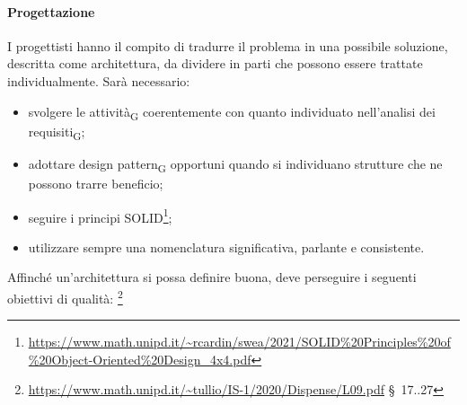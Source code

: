         \paragraph{Progettazione}
                I progettisti hanno il compito di tradurre il problema in una possibile soluzione, descritta come architettura, da dividere in parti che possono essere trattate individualmente. Sarà necessario:
                \begin{itemize}
                    \item svolgere le attività\textsubscript{G} coerentemente con quanto individuato nell'analisi dei requisiti\textsubscript{G};
                    \item adottare design pattern\textsubscript{G} opportuni quando si individuano strutture che ne possono trarre beneficio;
                    \item seguire i principi SOLID\footnote{\url{https://www.math.unipd.it/~rcardin/swea/2021/SOLID\%20Principles\%20of\%20Object-Oriented\%20Design_4x4.pdf}};
                    \item utilizzare sempre una nomenclatura significativa, parlante e consistente.
                \end{itemize}
                Affinché un'architettura si possa definire buona, deve perseguire i seguenti obiettivi di qualità: \footnote{\url{https://www.math.unipd.it/~tullio/IS-1/2020/Dispense/L09.pdf} \S\ 17..27}
